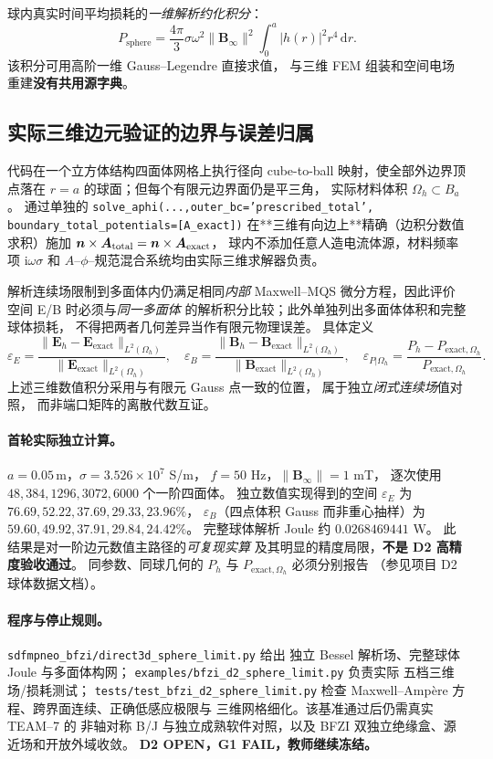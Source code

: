 球内真实时间平均损耗的\emph{一维解析约化积分}：
\begin{equation}
\boxed{P_\mathrm{sphere}=
\frac{4\pi}{3}\sigma\omega^2
\|\bm B_\infty\|^2
\int_0^a |h(r)|^2r^4\,\mathrm dr.}
\end{equation}
该积分可用高阶一维 Gauss--Legendre 直接求值，
与三维 FEM 组装和空间电场重建\textbf{没有共用源字典}。

\subsection{实际三维边元验证的边界与误差归属}
代码在一个立方体结构四面体网格上执行径向
cube-to-ball 映射，使全部外边界顶点落在
$r=a$ 的球面；但每个有限元边界面仍是平三角，
实际材料体积 $\Omega_h\subset B_a$。
通过单独的
\texttt{solve\_aphi(...,outer\_bc='prescribed\_total',
boundary\_total\_potentials=[A\_exact])}
在**三维有向边上**精确（边积分数值求积）施加
$\bm n\times\bm A_{\rm total}
=\bm n\times\bm A_{\rm exact}$，
球内不添加任意人造电流体源，材料频率项
$\mathrm i\omega\sigma$ 和
$A$--$\phi$--规范混合系统均由实际三维求解器负责。

解析连续场限制到多面体内仍满足相同\emph{内部} Maxwell--MQS
微分方程，因此评价空间 E/B 时必须与\emph{同一多面体}
的解析积分比较；此外单独列出多面体体积和完整球体损耗，
不得把两者几何差异当作有限元物理误差。
具体定义
\begin{equation}
\varepsilon_E=
\frac{\|\bm E_h-\bm E_\mathrm{exact}\|_{L^2(\Omega_h)}}
{\|\bm E_\mathrm{exact}\|_{L^2(\Omega_h)}},\quad
\varepsilon_B=
\frac{\|\bm B_h-\bm B_\mathrm{exact}\|_{L^2(\Omega_h)}}
{\|\bm B_\mathrm{exact}\|_{L^2(\Omega_h)}},
\quad
\varepsilon_{P|\Omega_h}=
\frac{P_h-P_{\mathrm{exact},\Omega_h}}
{P_{\mathrm{exact},\Omega_h}}.
\end{equation}
上述三维数值积分采用与有限元 Gauss 点一致的位置，
属于独立\emph{闭式连续场}值对照，
而非端口矩阵的离散代数互证。

\paragraph{首轮实际独立计算。}
$a=0.05\,$m，$\sigma=3.526\times10^7$ S/m，
$f=50$ Hz，$\|\bm B_\infty\|=1$ mT，
逐次使用 $48,384,1296,3072,6000$ 个一阶四面体。
独立数值实现得到的空间 $\varepsilon_E$
为 $76.69,52.22,37.69,29.33,23.96\%$，
$\varepsilon_B$（四点体积 Gauss 而非重心抽样）为
$59.60,49.92,37.91,29.84,24.42\%$。
完整球体解析 Joule 约
$0.0268469441$ W。
此结果是对一阶边元数值主路径的\emph{可复现实算}
及其明显的精度局限，\textbf{不是 D2 高精度验收通过}。
同参数、同球几何的 $P_h$ 与
$P_{\mathrm{exact},\Omega_h}$ 必须分别报告
（参见项目 D2 球体数据文档）。

\paragraph{程序与停止规则。}
\texttt{sdfmpneo\_bfzi/direct3d\_sphere\_limit.py} 给出
独立 Bessel 解析场、完整球体 Joule 与多面体构网；
\texttt{examples/bfzi\_d2\_sphere\_limit.py} 负责实际
五档三维场/损耗测试；
\texttt{tests/test\_bfzi\_d2\_sphere\_limit.py} 检查
Maxwell--Amp\`ere 方程、跨界面连续、正确低感应极限与
三维网格细化。该基准通过后仍需真实 TEAM--7 的
非轴对称 B/J 与独立成熟软件对照，以及 BFZI
双独立绝缘盒、源近场和开放外域收敛。
\textbf{D2 OPEN，G1 FAIL，教师继续冻结。}
